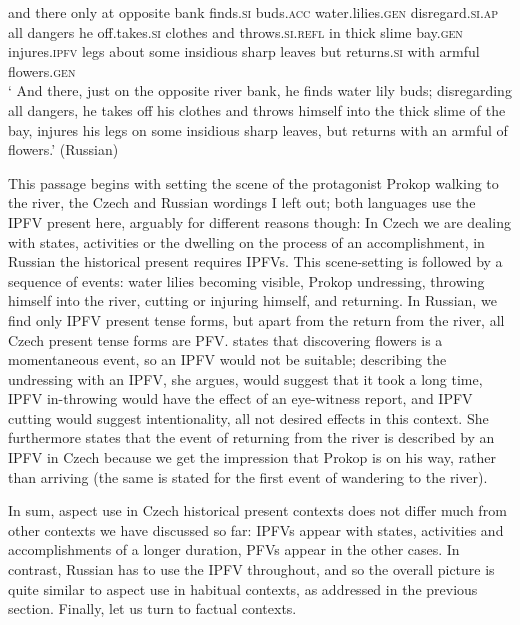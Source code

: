 \documentclass[output=paper,colorlinks,citecolor=brown]{langscibook}
\begin{document}
and there only at opposite bank finds.\textsc{si} buds.\textsc{acc} water.lilies.\textsc{gen} disregard.\textsc{si.ap} all dangers he off.takes.\textsc{si} clothes and throws.\textsc{si.refl} in thick slime bay.\textsc{gen} injures.\textsc{ipfv} legs about some insidious sharp leaves but returns.\textsc{si} with  armful flowers.\textsc{gen}\\
\glt `%
And there, just on the opposite river bank, he finds water lily buds; disregarding all dangers, he takes off his clothes and throws himself into the thick slime of the bay, injures his legs on some insidious sharp leaves, but returns with an armful of flowers.' \hfill (Russian)
\z
\z

\noindent This passage begins with setting the scene of the protagonist Prokop walking to the river, the Czech and Russian wordings I left out; both languages use the IPFV present here, arguably for different reasons though: In Czech we are dealing with states, activities or the dwelling on the process of an accomplishment, in Russian the historical present requires IPFVs. This scene-setting is followed by a sequence of events: water lilies becoming visible, Prokop undressing, throwing himself into the river, cutting or injuring himself, and returning. In Russian, we find only IPFV present tense forms, but apart from the return from the river, all Czech present tense forms are PFV. \citeauthor{stunova93} states that discovering flowers is a momentaneous event, so an IPFV would not be suitable; describing the undressing with an IPFV, she argues, would suggest that it took a long time, IPFV in-throwing would have the effect of an eye-witness report, and IPFV cutting would suggest intentionality, all not desired effects in this context. She furthermore states that the event of %
returning from the river is described by an IPFV in Czech because we get the impression that Prokop is on his way, rather than arriving (the same is stated for the first event of wandering to the river). 

In sum, aspect use in Czech historical present contexts does not differ much from other contexts we have discussed so far: IPFVs appear with states, activities and accomplishments of a longer duration, PFVs appear in the other cases. In contrast, Russian has to use the IPFV throughout, and so the overall picture is quite similar to aspect use in habitual contexts, as addressed in the previous section. Finally, let us turn to factual contexts. 
\end{document}
